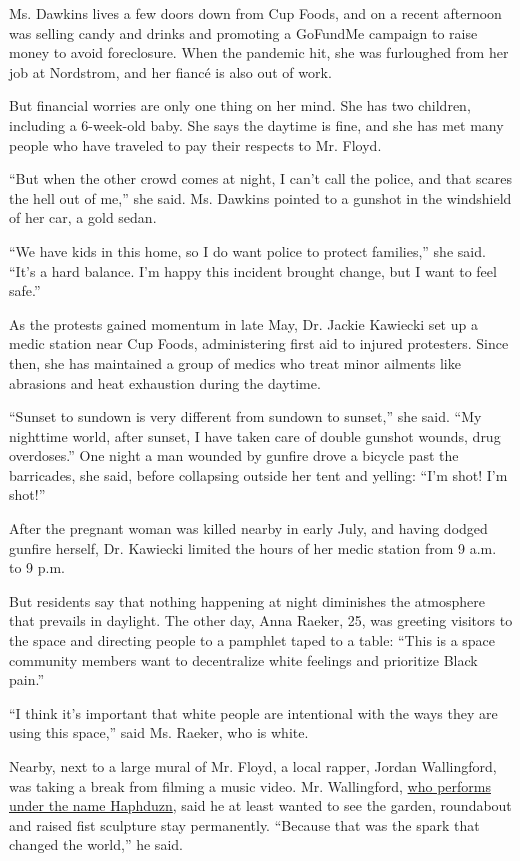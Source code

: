 Ms. Dawkins lives a few doors down from Cup Foods, and on a recent
afternoon was selling candy and drinks and promoting a GoFundMe campaign
to raise money to avoid foreclosure. When the pandemic hit, she was
furloughed from her job at Nordstrom, and her fiancé is also out of
work.

But financial worries are only one thing on her mind. She has two
children, including a 6-week-old baby. She says the daytime is fine, and
she has met many people who have traveled to pay their respects to Mr.
Floyd.

``But when the other crowd comes at night, I can't call the police, and
that scares the hell out of me,'' she said. Ms. Dawkins pointed to a
gunshot in the windshield of her car, a gold sedan.

``We have kids in this home, so I do want police to protect families,''
she said. ``It's a hard balance. I'm happy this incident brought change,
but I want to feel safe.''

As the protests gained momentum in late May, Dr. Jackie Kawiecki set up
a medic station near Cup Foods, administering first aid to injured
protesters. Since then, she has maintained a group of medics who treat
minor ailments like abrasions and heat exhaustion during the daytime.

``Sunset to sundown is very different from sundown to sunset,'' she
said. ``My nighttime world, after sunset, I have taken care of double
gunshot wounds, drug overdoses.'' One night a man wounded by gunfire
drove a bicycle past the barricades, she said, before collapsing outside
her tent and yelling: ``I'm shot! I'm shot!''

After the pregnant woman was killed nearby in early July, and having
dodged gunfire herself, Dr. Kawiecki limited the hours of her medic
station from 9 a.m. to 9 p.m.

But residents say that nothing happening at night diminishes the
atmosphere that prevails in daylight. The other day, Anna Raeker, 25,
was greeting visitors to the space and directing people to a pamphlet
taped to a table: ``This is a space community members want to
decentralize white feelings and prioritize Black pain.''

``I think it's important that white people are intentional with the ways
they are using this space,'' said Ms. Raeker, who is white.

Nearby, next to a large mural of Mr. Floyd, a local rapper, Jordan
Wallingford, was taking a break from filming a music video. Mr.
Wallingford,
\href{https://www.startribune.com/meet-haphduzn-the-new-guy-on-atmosphere-s-welcome-to-minnesota-tour/193927531/}{who
performs under the name Haphduzn}, said he at least wanted to see the
garden, roundabout and raised fist sculpture stay permanently. ``Because
that was the spark that changed the world,'' he said.

